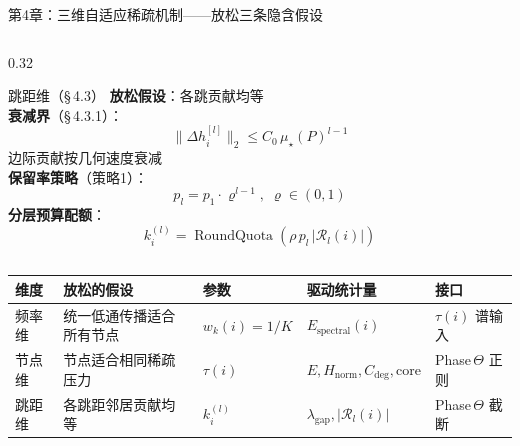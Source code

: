 \documentclass[aspectratio=169,9pt,xcolor=dvipsnames]{beamer}
\newcommand{\green}[1]{\textcolor{mygreen}{#1}}
\begin{document}
\begin{frame}{第4章：三维自适应稀疏机制——放松三条隐含假设}
\begin{columns}[T]
\begin{column}{0.32\textwidth}
  \begin{exampleblock}{\green{跳距维（§\,4.3）}}
    \small
    \textbf{放松假设}：各跳贡献均等\\[4pt]
    \textbf{衰减界}（§\,4.3.1）：
    \begin{equation*}
      \|\Delta h_i^{[l]}\|_2\le C_0\,\mu_\star(P)^{l-1}
    \end{equation*}
    边际贡献按几何速度衰减\\[4pt]
    \textbf{保留率策略}（策略1）：
    \begin{equation*}
      p_l=p_1\cdot\varrho^{l-1},\;\varrho\in(0,1)
    \end{equation*}
    \textbf{分层预算配额}：
    \begin{equation*}
      k_i^{(l)}=\operatorname{RoundQuota}(\rho\,p_l\,|\mathcal{R}_l(i)|)
    \end{equation*}
  \end{exampleblock}
\end{column}

\end{columns}

\vspace{0.05cm}
\centering
\begin{tabular}{m{1.4cm}m{3cm}m{1.8cm}m{2.8cm}m{2cm}}
  \toprule
  \textbf{维度} & \textbf{放松的假设} & \textbf{参数} & \textbf{驱动统计量} & \textbf{接口} \\
  \midrule
  频率维 & 统一低通传播适合所有节点 & $w_k(i)=1/K$ & $E_{\mathrm{spectral}}(i)$ & $\tau(i)$ 谱输入 \\
  节点维 & 节点适合相同稀疏压力 & $\tau(i)$ & $E,H_{\mathrm{norm}},C_{\mathrm{deg}},\mathrm{core}$ & Phase\,$\Theta$ 正则 \\
  跳距维 & 各跳距邻居贡献均等 & $k_i^{(l)}$ & $\lambda_{\mathrm{gap}},|\mathcal{R}_l(i)|$ & Phase\,$\Theta$ 截断 \\
  \bottomrule
\end{tabular}
\end{frame}
\end{document}
